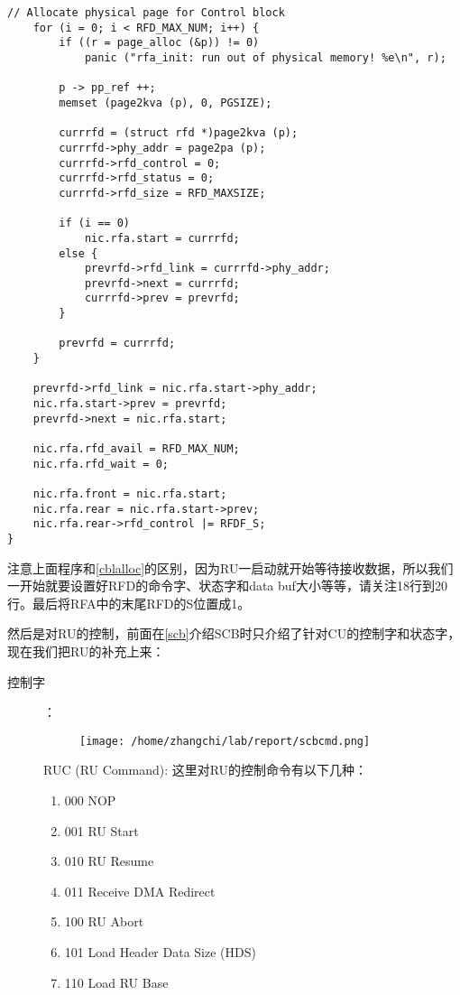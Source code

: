 \documentclass{article}
\begin{document}
\begin{CJK*}{UTF8}{gkai}
\begin{lstlisting}[style=ccode, title={\scriptsize \ttfamily \bfseries kern/e100.c: rfa\_alloc()}]
    // Allocate physical page for Control block
    for (i = 0; i < RFD_MAX_NUM; i++) {
        if ((r = page_alloc (&p)) != 0)
            panic ("rfa_init: run out of physical memory! %e\n", r);

        p -> pp_ref ++;
        memset (page2kva (p), 0, PGSIZE);

        currrfd = (struct rfd *)page2kva (p);
        currrfd->phy_addr = page2pa (p);
        currrfd->rfd_control = 0;
        currrfd->rfd_status = 0;
        currrfd->rfd_size = RFD_MAXSIZE;

        if (i == 0)
            nic.rfa.start = currrfd;
        else {
            prevrfd->rfd_link = currrfd->phy_addr;
            prevrfd->next = currrfd;
            currrfd->prev = prevrfd;
        }

        prevrfd = currrfd;
    }

    prevrfd->rfd_link = nic.rfa.start->phy_addr;
    nic.rfa.start->prev = prevrfd;
    prevrfd->next = nic.rfa.start;

    nic.rfa.rfd_avail = RFD_MAX_NUM;
    nic.rfa.rfd_wait = 0;

    nic.rfa.front = nic.rfa.start;
    nic.rfa.rear = nic.rfa.start->prev;
    nic.rfa.rear->rfd_control |= RFDF_S;
}

\end{lstlisting}

注意上面程序和\ref{cblalloc}的区别，因为RU一启动就开始等待接收数据，所以我们一开始就要设置好RFD的命令字、状态字和data buf大小等等，请关注18行到20行。最后将RFA中的末尾RFD的S位置成1。


\label{scbru}

然后是对RU的控制，前面在\ref{scb}介绍SCB时只介绍了针对CU的控制字和状态字，现在我们把RU的补充上来：

\begin{description}
\item[控制字]：\\
\begin{figure}[htp]
\centering
\texttt{[image: /home/zhangchi/lab/report/scbcmd.png]}
\end{figure}

RUC (RU Command): 这里对RU的控制命令有以下几种：

\begin{enumerate}
\item{000 NOP}
\item{001 RU Start}
\item{010 RU Resume}
\item{011 Receive DMA Redirect}
\item{100 RU Abort}
\item{101 Load Header Data Size (HDS)}
\item{110 Load RU Base}
\end{enumerate}


\end{description}
\end{CJK*}
\end{document}
